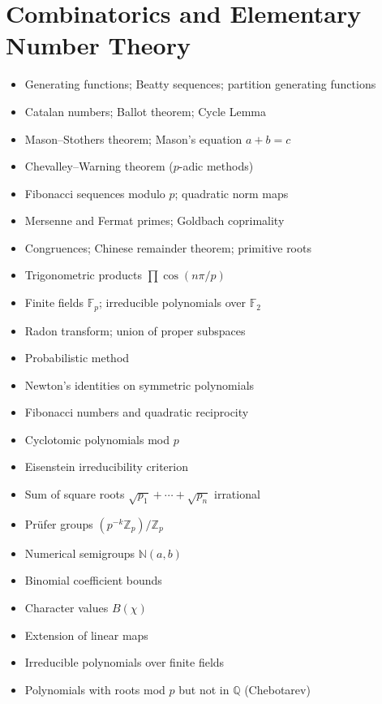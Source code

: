 \documentclass{amsart}
\begin{document}
\section{Combinatorics and Elementary Number Theory}

\begin{itemize}
  \item Generating functions; Beatty sequences; partition generating functions
  \item Catalan numbers; Ballot theorem; Cycle Lemma
  \item Mason--Stothers theorem; Mason's equation $a+b=c$
  \item Chevalley--Warning theorem ($p$-adic methods)
  \item Fibonacci sequences modulo $p$; quadratic norm maps
  \item Mersenne and Fermat primes; Goldbach coprimality
  \item Congruences; Chinese remainder theorem; primitive roots
  \item Trigonometric products $\prod\cos(n\pi/p)$
  \item Finite fields $\mathbb{F}_p$; irreducible polynomials over $\mathbb{F}_2$
  \item Radon transform; union of proper subspaces
  \item Probabilistic method
  \item Newton's identities on symmetric polynomials
  \item Fibonacci numbers and quadratic reciprocity
  \item Cyclotomic polynomials mod $p$
  \item Eisenstein irreducibility criterion
  \item Sum of square roots $\sqrt{p_1}+\cdots+\sqrt{p_n}$ irrational
  \item Pr\"ufer groups $(p^{-k}\mathbb{Z}_p)/\mathbb{Z}_p$
  \item Numerical semigroups $\mathbb{N}(a,b)$
  \item Binomial coefficient bounds
  \item Character values $B(\chi)$
  \item Extension of linear maps
  \item Irreducible polynomials over finite fields
  \item Polynomials with roots mod $p$ but not in $\mathbb{Q}$ (Chebotarev)
\end{itemize}
\end{document}
